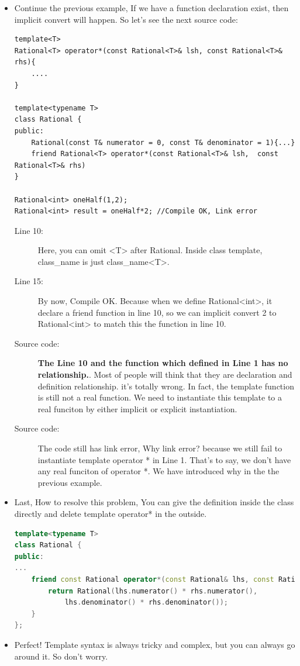 \documentclass[a4paper,11pt,twoside]{book}
\begin{document}
\begin{itemize}
	\item Continue the previous example, If we have a function declaration exist, then implicit convert will happen. So let's see the next source code:
\begin{lstlisting}
template<T>
Rational<T> operator*(const Rational<T>& lsh, const Rational<T>& rhs){
	....
}

template<typename T>
class Rational {
public:
	Rational(const T& numerator = 0, const T& denominator = 1){...}
	friend Rational<T> operator*(const Rational<T>& lsh,  const Rational<T>& rhs)
} 

Rational<int> oneHalf(1,2);
Rational<int> result = oneHalf*2; //Compile OK, Link error
\end{lstlisting}
\begin{description}
	\item[Line 10:] Here, you can omit <T> after Rational. Inside class template, class\_name is just class\_name<T>.
	
	\item[Line 15:] By now, Compile OK. Because when we define Rational<int>, it declare a friend function in line 10, so we can implicit convert 2 to Rational<int> to match this the function in line 10.
	
	\item[Source code:] \textbf{The Line 10 and the function which defined in Line 1 has no relationship.}. Most of people will think that they are declaration and definition relationship. it's totally wrong. In fact, the template function is still not a real function.  We need to instantiate this template to a real funciton by either implicit or explicit instantiation.
	
	\item[Source code:] The code still has link error, Why link error? because we still fail to instantiate template operator * in Line 1. That's to say, we don't have any real funciton of operator *. We have introduced why in the the previous example.
\end{description}

	\item Last, How to resolve this problem, You can give the definition inside the class directly and delete template operator* in the outside. 
\begin{lstlisting}[frame=single, language=c++]
template<typename T>
class Rational {
public:
...
	friend const Rational operator*(const Rational& lhs, const Rational& rhs){
		return Rational(lhs.numerator() * rhs.numerator(), 
			lhs.denominator() * rhs.denominator());  
	} 
};
\end{lstlisting}

	\item Perfect! Template syntax is always tricky and complex, but you can always go around it. So don't worry.

\end{itemize}
\end{document}
